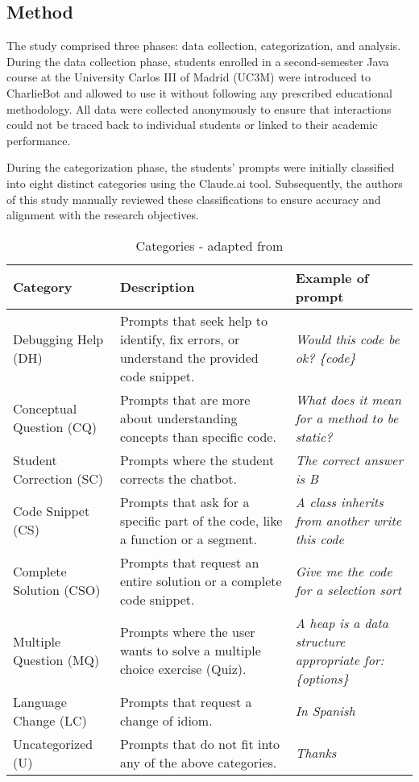 \documentclass[sn-apa]{sn-jnl} %
\begin{document}
\subsection{Method}

The study comprised three phases: data collection, categorization, and analysis.
During the data collection phase, students enrolled in a second-semester Java
course at the University Carlos III of Madrid (UC3M) were introduced to
CharlieBot and allowed to use it without following any prescribed educational
methodology. All data were collected anonymously to ensure that interactions
could not be traced back to individual students or linked to their academic
performance.

During the categorization phase, the students' prompts were initially classified
into eight distinct categories using the Claude.ai \citep{claude} tool.
Subsequently, the authors of this study manually reviewed these classifications
to ensure accuracy and alignment with the research objectives.

\begin{table*}[htbp]
    \caption{Categories - adapted from \cite{Ghimire24}}
    \begin{center}
      \renewcommand{\arraystretch}{1.2} %
      \begin{tabular}{p{3cm} p{4cm} p{3cm}} %
        \hline
        \textbf{Category} & \textbf{Description} & \textbf{Example of prompt} \\
        \hline
        Debugging Help (DH) & Prompts that seek help to identify, fix errors, or understand the provided code snippet. & \textit{Would this code be ok? \{code\}} \\
        Conceptual Question (CQ) & Prompts that are more about understanding concepts than specific code. & \textit{What does it mean for a method to be static?} \\
        Student Correction (SC) & Prompts where the student corrects the chatbot. & \textit{The correct answer is B} \\
        Code Snippet  (CS) & Prompts that ask for a specific part of the code, like a function or a segment. & \textit{A class inherits from another write this code} \\
        Complete Solution (CSO) & Prompts that request an entire solution or a complete code snippet. & \textit{Give me the code for a selection sort} \\
        Multiple Question (MQ) & Prompts where the user wants to solve a multiple choice exercise (Quiz). & \textit{A heap is a data structure appropriate for: \{options\}} \\
        Language Change (LC) & Prompts that request a change of idiom. & \textit{In Spanish} \\
        Uncategorized (U) & Prompts that do not fit into any of the above categories. & \textit{Thanks} \\
        \hline
      \end{tabular}
      \label{tab:categories}
    \end{center}
  \end{table*}
\end{document}
